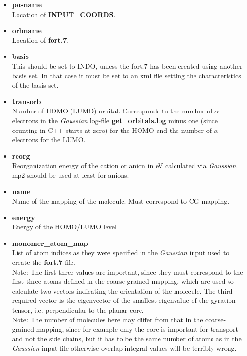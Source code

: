 \begin{itemize}
 \item {\bf posname} \\
 Location of {\bf INPUT\_COORDS}.
 \item {\bf orbname} \\
 Location of {\bf fort.7}.
 \item{\bf basis} \\
 This should be set to INDO, unless the fort.7 has been created using another basis set. In that case it must be set to an xml file setting the characteristics of the basis set.
 \item {\bf transorb} \\
 Number of HOMO (LUMO) orbital. Corresponds to the number of $\alpha$ electrons in the \emph{Gaussian} log-file {\bf get\_orbitals.log} minus one (since counting in C++ starts at zero) for the HOMO and the number of $\alpha$ electrons for the LUMO.
 \item {\bf reorg} \\
 Reorganization energy of the cation or anion in eV calculated via \emph{Gaussian}. mp2 should be used at least for anions.
 \item {\bf name} \\
 Name of the mapping of the molecule. Must correspond to CG mapping.
 \item {\bf energy} \\
 Energy of the HOMO/LUMO level
 \item {\bf monomer\_atom\_map} \\
 List of atom indices as they were specified in the \emph{Gaussian} input used to create the {\bf fort.7} file. \\
 Note: The first three values are important, since they must correspond to the first three atoms defined in the coarse-grained mapping, which are used to calculate two vectors indicating the orientation of the molecule. The third required vector is the eigenvector of the smallest eigenvalue of the gyration tensor, i.e. perpendicular to the planar core. \\
 Note: The number of molecules here may differ from that in the coarse-grained mapping, since for example only the core is important for transport and not the side chains, but it has to be the same number of atoms as in the \emph{Gaussian} input file otherwise overlap integral values will be terribly wrong.
\end{itemize}
